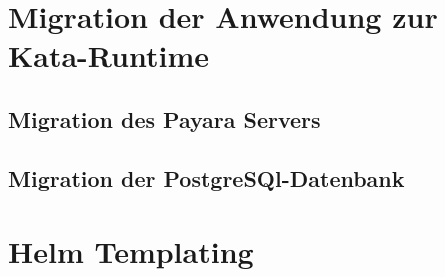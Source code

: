 \section{Migration der Anwendung zur Kata-Runtime}


\subsection{Migration des Payara Servers}


\subsection{Migration der PostgreSQl-Datenbank}


\section{Helm Templating}